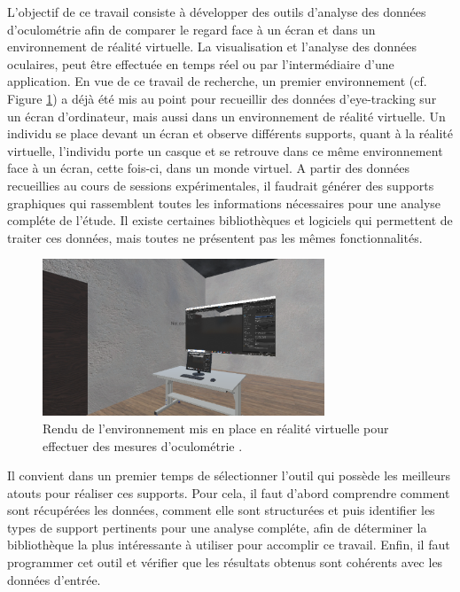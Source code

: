 \documentclass[hidelinks,12pt]{article}
\begin{document}
\bigskip
L'objectif de ce travail consiste à développer des outils d'analyse des données
d'oculométrie afin de comparer le regard face à un écran et dans un
environnement de réalité virtuelle. La visualisation et l'analyse des données
oculaires, peut être effectuée en temps réel ou par l'intermédiaire d'une
application. En vue de ce travail de recherche, un premier environnement (cf.
Figure \ref{fig:environnement}) a déjà été mis au point pour recueillir des
données d'eye-tracking sur un écran d'ordinateur, mais aussi dans un
environnement de réalité virtuelle. Un individu se place devant un écran et
observe différents supports, quant à la réalité virtuelle, l'individu porte un
casque et se retrouve dans ce même environnement face à un écran, cette fois-ci,
dans un monde virtuel. A partir des données recueillies au cours de sessions
expérimentales, il faudrait générer des supports graphiques qui rassemblent
toutes les informations nécessaires pour une analyse compléte de l'étude. Il
existe certaines bibliothèques et logiciels qui permettent de traiter ces
données, mais toutes ne présentent pas les mêmes fonctionnalités.

\begin{figure}[htpb]
  \centering
  \includegraphics[width=0.75\textwidth,keepaspectratio=true]{environnement.png}
  \caption{Rendu de l'environnement mis en place en réalité virtuelle pour
    effectuer des mesures d'oculométrie \cite{img_environnement}.}
  \label{fig:environnement}
\end{figure}

\bigskip
Il convient dans un premier temps de sélectionner l'outil qui possède les
meilleurs atouts pour réaliser ces supports. Pour cela, il faut d'abord
comprendre comment sont récupérées les données, comment elle sont structurées
et puis identifier les types de support pertinents pour une analyse compléte,
afin de déterminer la bibliothèque la plus intéressante à utiliser pour
accomplir ce travail. Enfin, il faut programmer cet outil et vérifier que les
résultats obtenus sont cohérents avec les données d'entrée.
\end{document}
